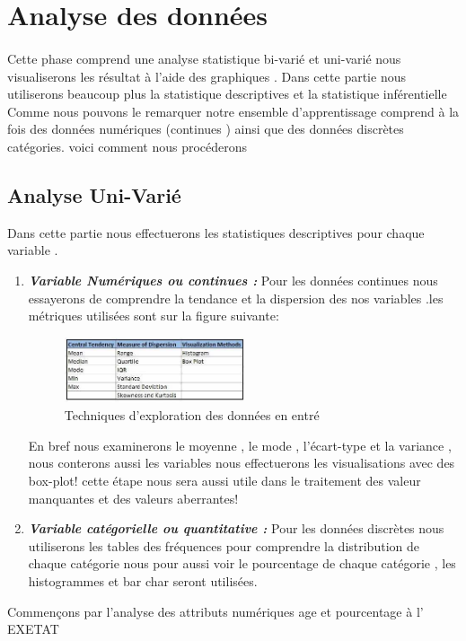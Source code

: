  \section{Analyse des données}\label{analyse-des-donnuxe9es}
\paragraph{}
Cette phase comprend une analyse statistique bi-varié et uni-varié nous
visualiserons les résultat à l'aide des graphiques . Dans cette partie
nous utiliserons beaucoup plus la statistique descriptives et la statistique inférentielle
Comme nous  pouvons le remarquer notre ensemble d'apprentissage
comprend à la fois des données numériques (continues ) ainsi que des
données discrètes catégories. voici comment nous procéderons 
\subsection{Analyse Uni-Varié}
Dans cette partie nous effectuerons les statistiques descriptives pour chaque variable .
\begin{enumerate}
	\item
	\emph{\textbf{Variable Numériques ou continues : }}Pour les données continues nous
	essayerons de comprendre la tendance et la dispersion des nos
	variables .les métriques utilisées sont sur la figure suivante: 
	\begin{figure}[ht]
		\centering
		\includegraphics[width=0.5\textwidth]{fig/DataExploration.png}
		\caption{Techniques d'exploration des données en entré }
		\label{fig:DataExplora}
	\end{figure}
	En bref nous examinerons le moyenne , le mode , l'écart-type et la
	variance , nous conterons aussi les variables nous effectuerons  les
	visualisations avec des box-plot! cette étape nous sera aussi utile
	dans le traitement des valeur manquantes et des valeurs aberrantes!
	\item
	\emph{\textbf{Variable catégorielle ou quantitative :}} Pour les données discrètes nous
	 utiliserons  les tables des fréquences pour comprendre la distribution de
	chaque catégorie nous pour aussi voir le pourcentage de chaque
	catégorie , les histogrammes et bar char seront utilisées.
\end{enumerate}
Commençons par l'analyse des attributs numériques age et pourcentage à l' \ac{EXETAT} 
